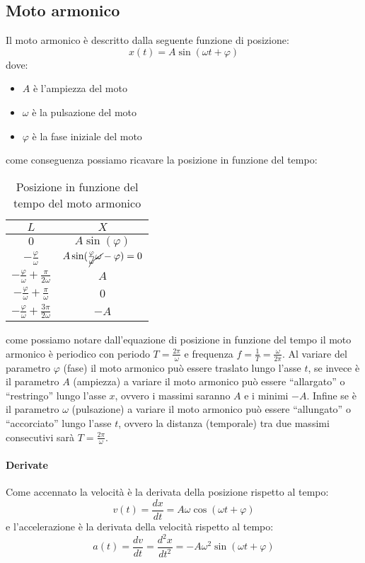     \subsection{Moto armonico}
        Il moto armonico è descritto dalla seguente funzione di posizione:
        $$
            x(t) = A\sin(\omega t + \varphi)
        $$
        dove:
        \begin{itemize}
            \item $A$ è l'ampiezza del moto
            \item $\omega$ è la pulsazione del moto
            \item $\varphi$ è la fase iniziale del moto
        \end{itemize}
        come conseguenza possiamo ricavare la posizione in funzione del tempo:
        \begin{table}[H]
            \centering
            \begin{tabular}{c|c}
                $L$ & $X$\\
                \hline
                $0$ & $A\sin(\varphi)$\\
                $-\frac{\varphi}{\omega}$ & $A\sin(\frac{\varphi}{\cancel{\omega}}\cancel{\omega}-\varphi) = 0$\\
                $-\frac{\varphi}{\omega}+\frac{\pi}{2\omega}$ & $A$\\
                $-\frac{\varphi}{\omega}+\frac{\pi}{\omega}$ & $0$\\
                $-\frac{\varphi}{\omega}+\frac{3\pi}{2\omega}$ & $-A$\\
            \end{tabular}
            \caption{Posizione in funzione del tempo del moto armonico}
        \end{table}
        come possiamo notare dall'equazione di posizione in funzione del tempo il moto armonico è periodico con periodo $T=\frac{2\pi}{\omega}$ e frequenza $f=\frac{1}{T}=\frac{\omega}{2\pi}$.\newline
        Al variare del parametro $\varphi$ (fase) il moto armonico può essere traslato lungo l'asse $t$, se invece è il parametro $A$ (ampiezza) a variare il moto armonico può essere ``allargato'' o ``restringo'' lungo l'asse $x$, ovvero i massimi saranno $A$ e i minimi $-A$. Infine se è il parametro $\omega$ (pulsazione) a variare il moto armonico può essere ``allungato'' o ``accorciato'' lungo l'asse $t$, ovvero la distanza (temporale) tra due massimi consecutivi sarà $T=\frac{2\pi}{\omega}$.
        \paragraph{Derivate}
            Come accennato la velocità è la derivata della posizione rispetto al tempo:
            $$
                v(t) = \frac{dx}{dt} = A\omega\cos(\omega t + \varphi)
            $$
            e l'accelerazione è la derivata della velocità rispetto al tempo:
            $$
                a(t) = \frac{dv}{dt} = \frac{d^2x}{dt^2} = -A\omega^2\sin(\omega t + \varphi)
            $$

